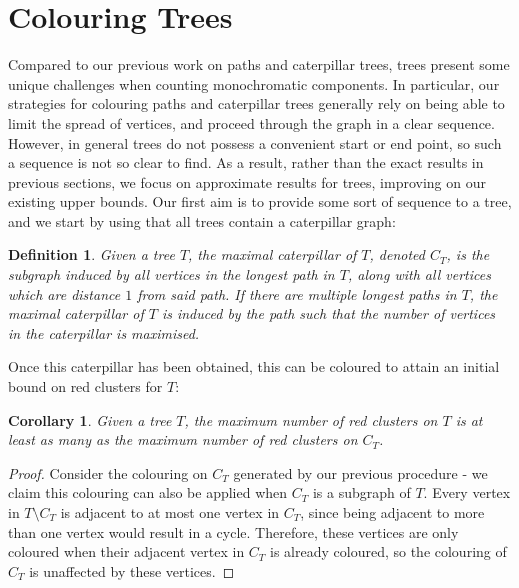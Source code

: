 \documentclass{mpaper}
\newtheorem{definition}[theorem]{Definition}
\newtheorem{corollary}[theorem]{Corollary}
\begin{document}
\section{Colouring Trees}
\label{sec/trees}

Compared to our previous work on paths and caterpillar trees, trees present some unique challenges when counting monochromatic components. In particular, our strategies for colouring paths and caterpillar trees generally rely on being able to limit the spread of vertices, and proceed through the graph in a clear sequence. However, in general trees do not possess a convenient start or end point, so such a sequence is not so clear to find. As a result, rather than the exact results in previous sections, we focus on approximate results for trees, improving on our existing upper bounds. Our first aim is to provide some sort of sequence to a tree, and we start by using that all trees contain a caterpillar graph:

\begin{definition}
  \label{def/maximal-caterpillar}
  Given a tree $T$, the \emph{maximal caterpillar of $T$}, denoted $C_T$, is the subgraph induced by all vertices in the longest path in $T$, along with all vertices which are distance $1$ from said path. If there are multiple longest paths in $T$, the maximal caterpillar of $T$ is induced by the path such that the number of vertices in the caterpillar is maximised.
\end{definition}

Once this caterpillar has been obtained, this can be coloured to attain an initial bound on red clusters for $T$:

\begin{corollary}
  \label{cor/tree-caterpillar}
  Given a tree $T$, the maximum number of red clusters on $T$ is at least as many as the maximum number of red clusters on $C_T$.
\end{corollary}

\begin{proof}
  Consider the colouring on $C_T$ generated by our previous procedure - we claim this colouring can also be applied when $C_T$ is a subgraph of $T$. Every vertex in $T \setminus C_T$ is adjacent to at most one vertex in $C_T$, since being adjacent to more than one vertex would result in a cycle. Therefore, these vertices are only coloured when their adjacent vertex in $C_T$ is already coloured, so the colouring of $C_T$ is unaffected by these vertices.
\end{proof}
\end{document}
